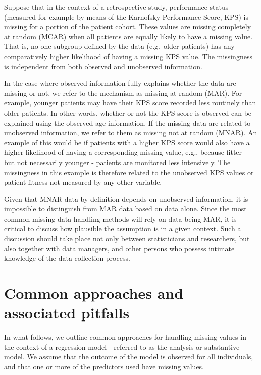 \documentclass[
  letterpaper,
  DIV=11,
  numbers=noendperiod]{scrreprt}
\begin{document}
Suppose that in the context of a retrospective study, performance status
(measured for example by means of the Karnofsky Performance Score, KPS)
is missing for a portion of the patient cohort. These values are missing
completely at random (MCAR) when all patients are equally likely to have
a missing value. That is, no one subgroup defined by the data
(e.g.~older patients) has any comparatively higher likelihood of having
a missing KPS value. The missingness is independent from both observed
and unobserved information.

In the case where observed information fully explains whether the data
are missing or not, we refer to the mechanism as missing at random
(MAR). For example, younger patients may have their KPS score recorded
less routinely than older patients. In other words, whether or not the
KPS score is observed can be explained using the observed age
information. If the missing data are related to unobserved information,
we refer to them as missing not at random (MNAR). An example of this
would be if patients with a higher KPS score would also have a higher
likelihood of having a corresponding missing value, e.g., because fitter
-- but not necessarily younger - patients are monitored less
intensively. The missingness in this example is therefore related to the
unobserved KPS values or patient fitness not measured by any other
variable.

Given that MNAR data by definition depends on unobserved information, it
is impossible to distinguish from MAR data based on data alone. Since
the most common missing data handling methods will rely on data being
MAR, it is critical to discuss how plausible the assumption is in a
given context. Such a discussion should take place not only between
statisticians and researchers, but also together with data managers, and
other persons who possess intimate knowledge of the data collection
process.

\hypertarget{common-approaches-and-associated-pitfalls}{%
\section{Common approaches and associated
pitfalls}\label{common-approaches-and-associated-pitfalls}}

In what follows, we outline common approaches for handling missing
values in the context of a regression model - referred to as the
analysis or substantive model. We assume that the outcome of the model
is observed for all individuals, and that one or more of the predictors
used have missing values.
\end{document}
